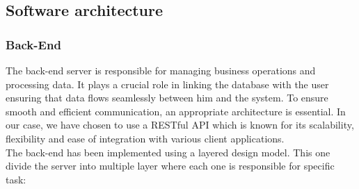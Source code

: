 \documentclass[12pt,a4paper,table,english]{article}
\begin{document}
	\pagebreak
	\subsection{Software architecture}
	
	\subsubsection{Back-End}
	
	The back-end server is responsible for managing business operations and processing data. It plays a crucial role in linking the database with the user ensuring that data flows seamlessly between him and the system. To ensure smooth and efficient communication, an appropriate architecture is essential. In our case, we have chosen to use a RESTful API which is known for its scalability, flexibility and ease of integration with various client applications.\\
	
	\noindent The back-end has been implemented using a layered design model. This one divide the server into multiple layer where each one is responsible for specific task: 
	
\end{document}

